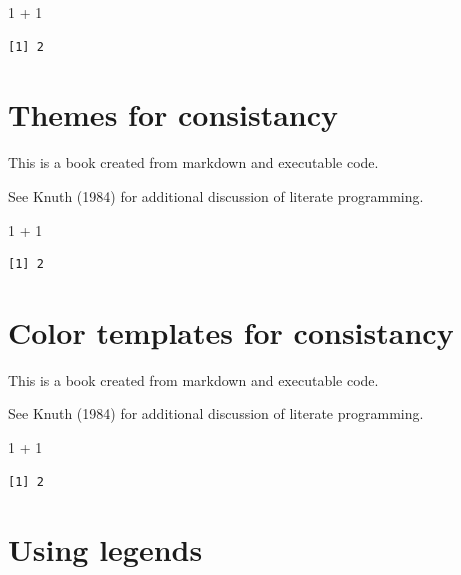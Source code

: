 \documentclass[
  letterpaper,
  DIV=11,
  numbers=noendperiod]{scrreprt}
\newenvironment{Shaded}{\begin{snugshade}}{\end{snugshade}}
\newcommand{\DecValTok}[1]{\textcolor[rgb]{0.68,0.00,0.00}{#1}}
\newcommand{\SpecialCharTok}[1]{\textcolor[rgb]{0.37,0.37,0.37}{#1}}
\begin{document}
\begin{Shaded}
\begin{Highlighting}[]
\DecValTok{1} \SpecialCharTok{+} \DecValTok{1}
\end{Highlighting}
\end{Shaded}

\begin{verbatim}
[1] 2
\end{verbatim}

\chapter{Themes for consistancy}\label{themes-for-consistancy}

This is a book created from markdown and executable code.

See Knuth (1984) for additional discussion of literate programming.

\begin{Shaded}
\begin{Highlighting}[]
\DecValTok{1} \SpecialCharTok{+} \DecValTok{1}
\end{Highlighting}
\end{Shaded}

\begin{verbatim}
[1] 2
\end{verbatim}

\chapter{Color templates for
consistancy}\label{color-templates-for-consistancy}

This is a book created from markdown and executable code.

See Knuth (1984) for additional discussion of literate programming.

\begin{Shaded}
\begin{Highlighting}[]
\DecValTok{1} \SpecialCharTok{+} \DecValTok{1}
\end{Highlighting}
\end{Shaded}

\begin{verbatim}
[1] 2
\end{verbatim}

\chapter{Using legends}\label{using-legends}
\end{document}
